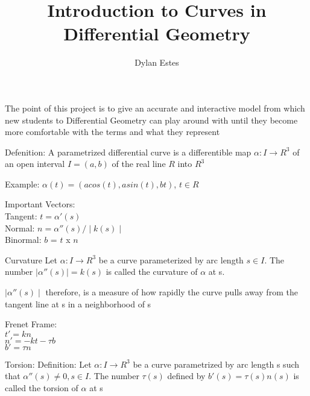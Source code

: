 \documentclass{beamer}
\title{Introduction to Curves in Differential Geometry}
\author{Dylan Estes}\institute{University of Washington}
\begin{document}
\begin{frame}
\titlepage

\end{frame}

\begin{frame}
The point of this project is to give an accurate and interactive model from which new students to Differential Geometry can play around with until they become more comfortable with the terms and what they represent
\end{frame}

\begin{frame}
Defenition: A parametrized differential curve is a differentible map $\alpha: I \rightarrow R^3$ of an open interval $I = (a,b)$ of the real line $R$ into $R^3$

Example: $\alpha(t) = (acos(t),asin(t),bt)$,  $t\in R$
\end{frame}


\begin{frame}
Important Vectors:\\
Tangent: $t = \alpha'(s)$\\
Normal: $n = \alpha''(s)/\mid k(s)\mid$\\
Binormal: $b$ = $t$ x $n$
\end{frame}

\begin{frame}
Curvature
Let $\alpha:I \rightarrow R^3$ be a curve parameterized by arc length $s \in I$. The number $\mid \alpha''(s)\mid = k(s)$ is called the curvature of $\alpha$ at s.

$\mid \alpha''(s)\mid$ therefore, is a measure of how rapidly the curve pulls away from the tangent line at s in a neighborhood of s
\end{frame}

\begin{frame}
Frenet Frame:\\
$t' = kn$\\
$n' = -kt - \tau b$\\
$b' = \tau n$\\
\end{frame}

\begin{frame}
Torsion: 
Definition: Let $\alpha:I \rightarrow R^3$ be a curve parametrized by arc length s such that $\alpha''(s) \neq 0, s \in I$. The number $\tau (s)$ defined by $ b'(s) = \tau (s)n(s)$ is called the torsion of $\alpha$ at s

\end{frame}
\end{document}
